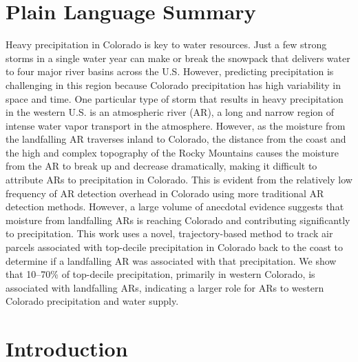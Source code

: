 \documentclass[draft]{agujournal2019}
\begin{document}
\section*{Plain Language Summary}
Heavy precipitation in Colorado is key to water resources. Just a few strong storms in a single water year can make or break the snowpack that delivers water to four major river basins across the U.S. However, predicting precipitation is challenging in this region because Colorado precipitation has high variability in space and time. One particular type of storm that results in heavy precipitation in the western U.S. is an atmospheric river (AR), a long and narrow region of intense water vapor transport in the atmosphere. However, as the moisture from the landfalling AR traverses inland to Colorado, the distance from the coast and the high and complex topography of the Rocky Mountains causes the moisture from the AR to break up and decrease dramatically, making it difficult to attribute ARs to precipitation in Colorado. This is evident from the relatively low frequency of AR detection overhead in Colorado using more traditional AR detection methods. However, a large volume of anecdotal evidence suggests that moisture from landfalling ARs is reaching Colorado and contributing significantly to precipitation. This work uses a novel, trajectory-based method to track air parcels associated with top-decile precipitation in Colorado back to the coast to determine if a landfalling AR was associated with that precipitation. We show that 10–70\% of top-decile precipitation, primarily in western Colorado, is associated with landfalling ARs, indicating a larger role for ARs to western Colorado precipitation and water supply.

%
%

\section{Introduction}
\label{intro}
\end{document}
